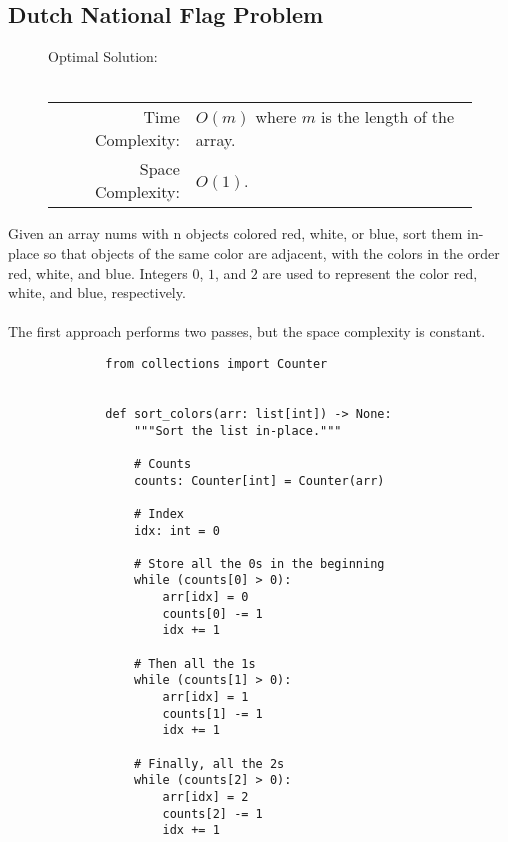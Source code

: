 
\subsection{Dutch National Flag Problem}

\begin{figure}[H]
    Optimal Solution:\\\\
    \begin{tabular}{rl}
        Time Complexity:& \(O(m)\) where \(m\) is the length of the array.\\
        Space Complexity:& \(O(1)\).
    \end{tabular}
\end{figure}

Given an array nums with n objects colored red, white, or blue, sort them
in-place so that objects of the same color are adjacent, with the colors in the
order red, white, and blue. Integers \(0\), \(1\), and \(2\) are used to
represent the color red, white, and blue, respectively.
\\\\
The first approach performs two passes, but the space complexity is constant.

\begin{figure}[H]
    \centering
    \begin{verbatim}
        from collections import Counter


        def sort_colors(arr: list[int]) -> None:
            """Sort the list in-place."""
        
            # Counts
            counts: Counter[int] = Counter(arr)

            # Index
            idx: int = 0

            # Store all the 0s in the beginning 
            while (counts[0] > 0): 
                arr[idx] = 0
                counts[0] -= 1
                idx += 1

            # Then all the 1s 
            while (counts[1] > 0): 
                arr[idx] = 1
                counts[1] -= 1
                idx += 1

            # Finally, all the 2s 
            while (counts[2] > 0): 
                arr[idx] = 2
                counts[2] -= 1
                idx += 1
    \end{verbatim}
\end{figure}

